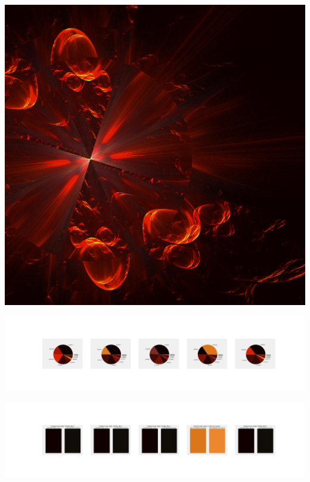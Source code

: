 \documentclass[11pt]{article}
\begin{document}
\begin{landscape}
    \begin{center}
    \includegraphics[width=\textwidth]{./nbimg/file (118).jpg}
    \end{center}

    \begin{center}
    \includegraphics[width=250mm]{./nbimg/pie-21.jpg}
    \end{center}

    \begin{center}
    \includegraphics[width=250mm]{./nbimg/peak-21.jpg}
    \end{center}
    


\end{landscape}
\end{document}
